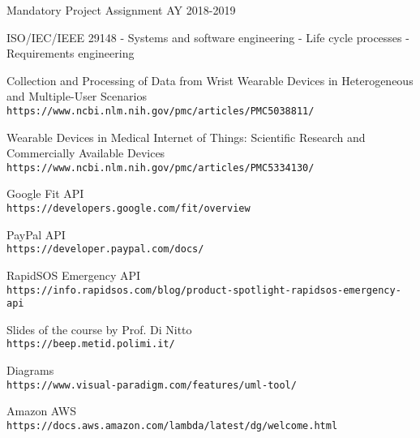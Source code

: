 \documentclass[../DD0.tex]{subfiles}
\begin{document}
\begin{thebibliography}{9}
   Mandatory Project Assignment AY 2018-2019


   ISO/IEC/IEEE 29148 - Systems and software engineering - Life cycle processes - Requirements engineering

   Collection and Processing of Data from Wrist Wearable Devices in Heterogeneous and Multiple-User Scenarios\\
  \texttt{https://www.ncbi.nlm.nih.gov/pmc/articles/PMC5038811/}

   Wearable Devices in Medical Internet of Things: Scientific Research and Commercially Available Devices\\
  \texttt{https://www.ncbi.nlm.nih.gov/pmc/articles/PMC5334130/}


   Google Fit API\\
  \texttt{https://developers.google.com/fit/overview}

   PayPal API\\
  \texttt{https://developer.paypal.com/docs/}

   RapidSOS Emergency API\\
  \texttt{https://info.rapidsos.com/blog/product-spotlight-rapidsos-emergency-api}

  Slides of the course by Prof. Di Nitto\\
  \texttt{https://beep.metid.polimi.it/}

  Diagrams\\
  \texttt{https://www.visual-paradigm.com/features/uml-tool/}

  Amazon AWS\\
  \texttt{https://docs.aws.amazon.com/lambda/latest/dg/welcome.html}

\end{thebibliography}
\end{document}
